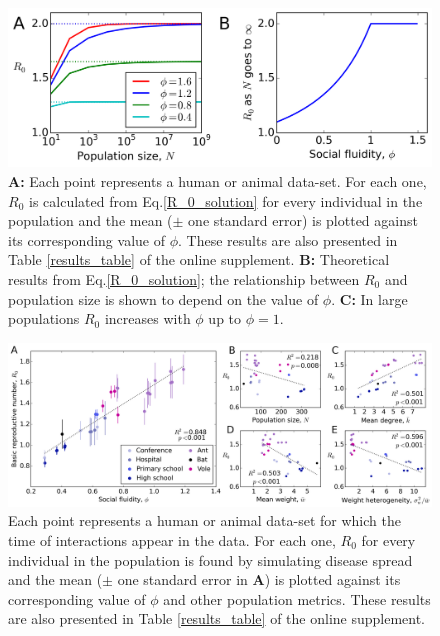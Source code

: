 \documentclass[10pt]{article}
\begin{document}
\begin{multicols}{2}
\begin{figure}[t]
 \centering
 \includegraphics[width=\textwidth]{Figures/disease_theory.png}
\caption{\textbf{A:} Each point represents a human or animal data-set. For each one, $R_{0}$ is calculated from Eq.\eqref{R_0_solution} for every individual in the population and the mean ($\pm$ one standard error) is plotted against its corresponding value of $\phi$. These results are also presented in Table \ref{results_table} of the online supplement. \textbf{B:} Theoretical results from Eq.\eqref{R_0_solution}; the relationship between $R_{0}$ and population size is shown to depend on the value of $\phi$. \textbf{C:} In large populations $R_{0}$ increases with $\phi$ up to $\phi=1$. \label{disease_theory}}
\end{figure}

\begin{figure}[t]
	\centering
	\includegraphics[width=\textwidth]{Figures/R0_for_all_networks.png}\qquad	
  	\caption{Each point represents a human or animal data-set for which the time of interactions appear in the data. For each one, $R_{0}$ for every individual in the population is found by simulating disease spread and the mean ($\pm$ one standard error in \textbf{A}) is plotted against its corresponding value of $\phi$ and other population metrics. These results are also presented in Table \ref{results_table} of the online supplement.\label{disease_simulation_fig}}
\end{figure}


\end{multicols}
\end{document}
